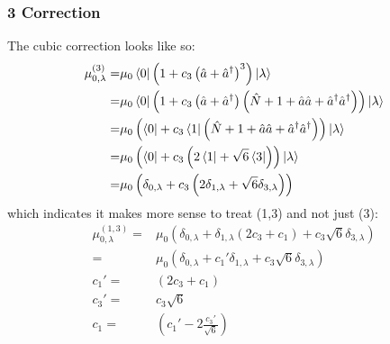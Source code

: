 \subsubsection{3  Correction}
The cubic correction looks like so:
\begin{align*}
	\mu^{(3)}_{0,\lambda} =& \mu_0 \bra{0} \left( 1 + c_3\left(\hat{a} + \hat{a}^{\dagger}\right)^3\right) \ket{\lambda}\\
	=& \mu_0 \bra{0} \left( 1 + c_3 \left(\hat{a} + \hat{a}^{\dagger}\right) \left(\hat{N} + 1 + \hat{a}\hat{a} + \hat{a}^{\dagger}\hat{a}^{\dagger}\right)\right)\ket{\lambda}\\
	=& \mu_0 \left( \bra{0}  + c_3 \bra{1}  \left(\hat{N} + 1 + \hat{a}\hat{a} + \hat{a}^{\dagger}\hat{a}^{\dagger}\right)\right)\ket{\lambda}\\
	=& \mu_0 \left( \bra{0}  + c_3   \left(2\bra{1}  +\sqrt{6}\bra{3} \right)\right)\ket{\lambda}\\
	=& \mu_0 \left( \delta_{0,\lambda}  + c_3   \left(2\delta_{1,\lambda}  +\sqrt{6}\delta_{3,\lambda} \right)\right)
\end{align*}
which indicates it makes more sense to treat (1,3) and not just (3):
\begin{align*}
	\mu^{(1,3)}_{0,\lambda} =& \mu_0 \left( \delta_{0,\lambda}  +  \delta_{1,\lambda} \left(2c_3 + c_1\right)   +c_3 \sqrt{6}\delta_{3,\lambda} \right)\\
	=& \mu_0 \left( \delta_{0,\lambda}  +  c_1' \delta_{1,\lambda} +c_3 \sqrt{6}\delta_{3,\lambda} \right)\\
	c_1' =& \left(2c_3 + c_1\right)\\
	c_3' =& c_3 \sqrt{6} \\
	c_1 =& \left(c_1'  - 2\frac{c_3'}{\sqrt{6}} \right)
\end{align*}
